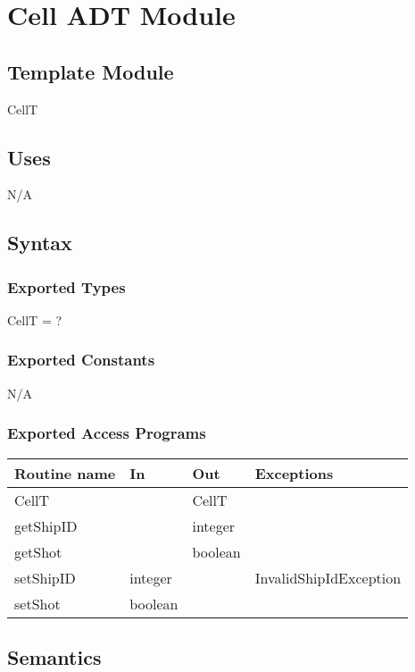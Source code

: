 \documentclass[12pt]{article}
\begin{document}
\newpage

\section {Cell ADT Module}

\subsection*{Template Module}

CellT

\subsection* {Uses}

N/A

\subsection* {Syntax}

\subsubsection* {Exported Types}

CellT = ?

\subsubsection* {Exported Constants}

N/A

\subsubsection* {Exported Access Programs}

\begin{tabular}{| l | l | l | l |}
\hline
\textbf{Routine name} & \textbf{In} & \textbf{Out} & \textbf{Exceptions}\\
\hline
CellT & ~ & CellT & ~\\
\hline
getShipID & ~ & integer & ~\\
\hline
getShot & ~ & boolean & ~\\
\hline
setShipID & integer & ~ & InvalidShipIdException\\
\hline
setShot & boolean & ~ & ~\\
\hline
\end{tabular}

\subsection* {Semantics}
\end{document}
